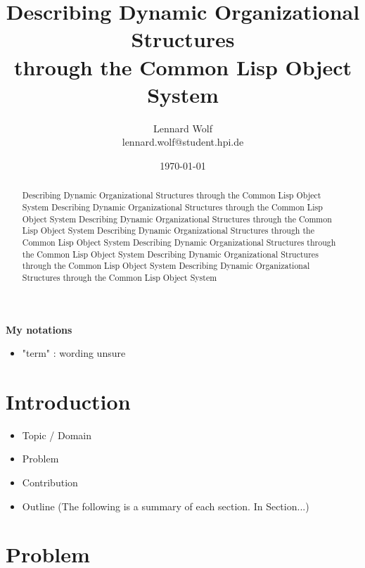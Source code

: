 \documentclass[oribibl]{llncs}
\author{Lennard Wolf \\
        lennard.wolf@student.hpi.de}
\institute{ Hasso Plattner Institute \\
            Prof.-Dr.-Helmert-Straße 2-3 \\
            14482 Potsdam \\
            Germany}
\title{Describing Dynamic Organizational Structures \\
 through the Common Lisp Object System}
\date{\today}
\begin{document}
\thispagestyle{empty}
\vfill

%
\maketitle
%
\begin{abstract}
Describing Dynamic Organizational Structures through the Common Lisp Object System Describing Dynamic Organizational Structures through the Common Lisp Object System Describing Dynamic Organizational Structures through the Common Lisp Object System Describing Dynamic Organizational Structures through the Common Lisp Object System Describing Dynamic Organizational Structures through the Common Lisp Object System Describing Dynamic Organizational Structures through the Common Lisp Object System Describing Dynamic Organizational Structures through the Common Lisp Object System
\end{abstract}
%


\textbf{My notations}

\begin{itemize}
\item "term" : wording unsure
\end{itemize}



\section{Introduction}


\begin{itemize}
\item Topic / Domain
\item Problem
\item Contribution
\item Outline (The following is a summary of each section. In Section...)
\end{itemize}


\section{Problem}
\label{sec:problem}
\end{document}
